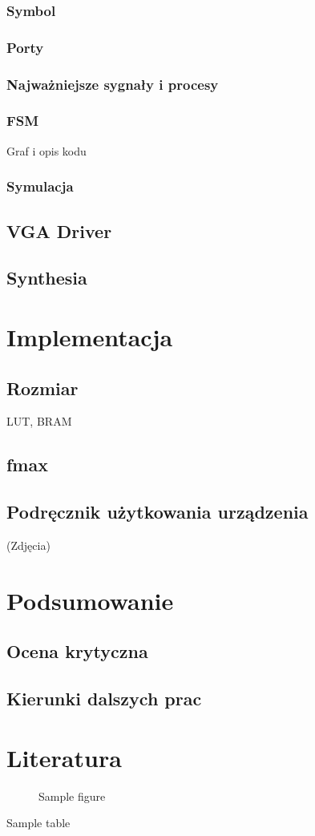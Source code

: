 \documentclass{article}
\begin{document}
		\subsubsection{Symbol}
		\subsubsection{Porty}
		\subsubsection{Najważniejsze sygnały i procesy}
		\subsubsection{FSM}
		Graf i opis kodu
		\subsubsection{Symulacja}
	\subsection{VGA Driver}
	\subsection{Synthesia}
	
\section{Implementacja}
	\subsection{Rozmiar}
	LUT, BRAM
	\subsection{fmax}
	\subsection{Podręcznik użytkowania urządzenia}
	(Zdjęcia)
	
\section{Podsumowanie}
	\subsection{Ocena krytyczna}	
	\subsection{Kierunki dalszych prac}
	
\section{Literatura}

\begin{figure}
	\caption{Sample figure}
\end{figure}
		
\begin{table}
	\caption{Sample table}
\end{table}

\begin{appendix}
	\listoffigures
	\listoftables
\end{appendix}
\end{document}
